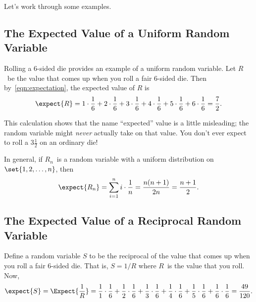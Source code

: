 Let's work through some examples.

\subsection{The Expected Value of a Uniform Random Variable}

Rolling a 6-sided die provides an example of a uniform random
variable.  Let $R$~be the value that comes up when you roll a fair
6-sided die.  Then by~\eqref{eqn:expectation}, the expected value of
$R$ is
\[
\expect{R}
     = 1 \cdot \frac{1}{6} + 2 \cdot \frac{1}{6} + 3 \cdot \frac{1}{6} +
        4 \cdot \frac{1}{6} + 5 \cdot \frac{1}{6} + 6 \cdot \frac{1}{6}
     = \frac{7}{2}.
\]

\iffalse
\begin{align*}
\expect{R}
    & = \sum_{k=1}^6 k \cdot \frac{1}{6} \\
    & = 1 \cdot \frac{1}{6} + 2 \cdot \frac{1}{6} + 3 \cdot \frac{1}{6} +
        4 \cdot \frac{1}{6} + 5 \cdot \frac{1}{6} + 6 \cdot \frac{1}{6} \\
    & = \frac{7}{2}
\end{align*}
\fi

This calculation shows that the name ``expected'' value is a little
misleading; the random variable might \emph{never} actually take on that
value.  You don't ever expect to roll a $3 \frac{1}{2}$ on an ordinary
die!

In general, if $R_n$~is a random variable with a uniform
distribution on~$\set{1, 2, \dots, n}$, then
\[
\expect{R_n}    = \sum_{i = 1}^n i \cdot \frac{1}{n}
                = \frac{n (n + 1)}{2n}
                = \frac{n + 1}{2}.
\]

\subsection{The Expected Value of a Reciprocal Random Variable}

Define a random variable $S$ to be the reciprocal of the value that
comes up when you roll a fair 6-sided die.  That is, $S = 1/R$ where
$R$~is the value that you roll.  Now,
\[
\expect{S}  =\Expect{\frac{1}{R}}
            = \frac{1}{1} \cdot \frac{1}{6}
               + \frac{1}{2} \cdot \frac{1}{6}
               + \frac{1}{3} \cdot \frac{1}{6}
               + \frac{1}{4} \cdot \frac{1}{6}
               + \frac{1}{5} \cdot \frac{1}{6}
               + \frac{1}{6} \cdot \frac{1}{6}
               = \frac{49}{120}.
\]

\iffalse
\begin{align*}
\expect{S} & =\expect{\frac{1}{R}}\\
           &  = \frac{1}{1} \cdot \frac{1}{6}
+ \frac{1}{2} \cdot \frac{1}{6}
+ \frac{1}{3} \cdot \frac{1}{6}
+ \frac{1}{4} \cdot \frac{1}{6}
+ \frac{1}{5} \cdot \frac{1}{6}
+ \frac{1}{6} \cdot \frac{1}{6} %
= \frac{49}{120}.
\end{align*}
\fi

